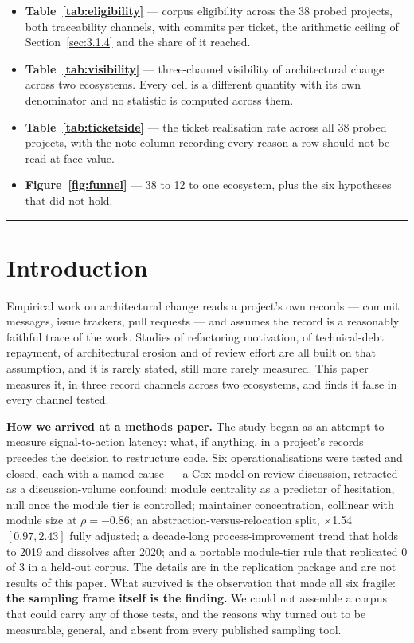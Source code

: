 \documentclass[conference]{IEEEtran}
\begin{document}
\begin{itemize}\setlength{\itemsep}{2pt}
\item \textbf{Table~\ref{tab:eligibility}} --- corpus eligibility across the 38
probed projects, both traceability channels, with commits per ticket, the
arithmetic ceiling of Section~\ref{sec:3.1.4} and the share of it reached.
\item \textbf{Table~\ref{tab:visibility}} --- three-channel visibility of
architectural change across two ecosystems. Every cell is a different quantity
with its own denominator and no statistic is computed across them.
\item \textbf{Table~\ref{tab:ticketside}} --- the ticket realisation rate across
all 38 probed projects, with the note column recording every reason a row should
not be read at face value.
\item \textbf{Figure~\ref{fig:funnel}} --- 38 to 12 to one ecosystem, plus the six hypotheses that did not hold.
\end{itemize}

\medskip\hrule


\section{Introduction}
\label{sec:1}

Empirical work on architectural change reads a project's own records --- commit messages, issue trackers, pull requests --- and assumes the record is a reasonably faithful trace of the work. Studies of refactoring motivation, of technical-debt repayment, of architectural erosion and of review effort are all built on that assumption, and it is rarely stated, still more rarely measured. This paper measures it, in three record channels across two ecosystems, and finds it false in every channel tested.

\textbf{How we arrived at a methods paper.} The study began as an attempt to measure signal-to-action latency: what, if anything, in a project's records precedes the decision to restructure code. Six operationalisations were tested and closed, each with a named cause --- a Cox model on review discussion, retracted as a discussion-volume confound; module centrality as a predictor of hesitation, null once the module tier is controlled; maintainer concentration, collinear with module size at $\rho = -0.86$; an abstraction-versus-relocation split, $\times$1.54 $[0.97, 2.43]$ fully adjusted; a decade-long process-improvement trend that holds to 2019 and dissolves after 2020; and a portable module-tier rule that replicated 0 of 3 in a held-out corpus. The details are in the replication package and are not results of this paper. What survived is the observation that made all six fragile: \textbf{the sampling frame itself is the finding.} We could not assemble a corpus that could carry any of those tests, and the reasons why turned out to be measurable, general, and absent from every published sampling tool.
\end{document}
